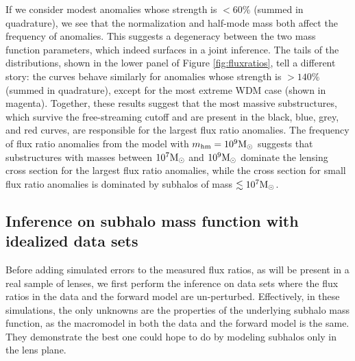If we consider modest anomalies whose strength is $<60\%$ (summed in quadrature), we see that the normalization and half-mode mass both affect the frequency of anomalies. This suggests a degeneracy between the two mass function parameters, which indeed surfaces in a joint inference. The tails of the distributions, shown in the lower panel of Figure \ref{fig:fluxratios}, tell a different story: the curves behave similarly for anomalies whose strength is $>140\%$ (summed in quadrature), except for the most extreme WDM case (shown in magenta).  Together, these results suggest that the most massive substructures, which survive the free-streaming cutoff and are present in the black, blue, grey, and red curves, are responsible for the largest flux ratio anomalies. The frequency of flux ratio anomalies from the model with $m_{\rm{hm}}=10^9{\rm{M}_{\odot}}$ suggests that substructures with masses between $10^7 {\rm{M}_{\odot}}$ and $10^9 {\rm{M}_{\odot}}$ dominate the lensing cross section for the largest flux ratio anomalies, while the cross section for small flux ratio anomalies is dominated by subhalos of mass $\lesssim 10^7 {\rm{M}_{\odot}}$.

\subsection{Inference on subhalo mass function with idealized data sets}
\label{ssec:idealized_inf}

Before adding simulated errors to the measured flux ratios, as will be present in a real sample of lenses, we first perform the inference on data sets where the flux ratios in the data and the forward model are un-perturbed. Effectively, in these simulations, the only unknowns are the properties of the underlying subhalo mass function, as the macromodel in both the data and the forward model is the same. They demonstrate the best one could hope to do by modeling subhalos only in the lens plane. 

